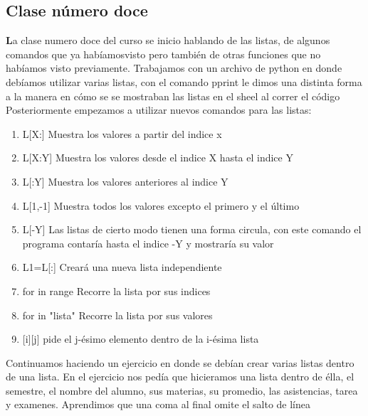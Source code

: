 \documentclass{book}
\begin{document}
\begin{enumerate}
\begin{enumerate}
\chapter{Clase número doce} 
\textbf La clase numero doce del curso se inicio hablando de las listas, de algunos comandos que ya habíamosvisto pero también de otras funciones que no habíamos visto previamente. Trabajamos con un archivo de python en donde debíamos utilizar varias listas, con el comando \color{blue} pprint \color{black} le dimos una distinta forma a la manera en cómo se se mostraban las listas en el sheel al correr el código\\
Posteriormente empezamos a utilizar nuevos comandos para las listas: 
\begin{enumerate}
	\item \color{green}L[X:] \color{orange} Muestra los valores a partir del indice x
	\item \color{green} L[X:Y] \color{orange} Muestra los valores desde el indice X hasta el indice Y \color{black}
	\item \color{green} L[:Y] \color{orange} Muestra los valores anteriores al indice Y \color{black} 
	\item \color{green} L[1,-1] \color{orange} Muestra todos los valores excepto el primero y el último \color{black}
	\item \color{green} L[-Y] \color{orange} Las listas de cierto modo tienen una forma circula, con este comando el programa contaría hasta el indice -Y y mostraría su valor \color{black}
	\item L1=L[:] \color{orange} Creará una nueva lista independiente \color{black}
	\item \color{green} for in range \color{orange} Recorre la lista por sus indices \color{black}
	\item \color{green} for in "lista" \color{orange} Recorre la lista por sus valores \color{black}
	\item \color{green} [i][j] \color{orange} pide el j-ésimo elemento dentro de la i-ésima lista 
\end{enumerate}
\color{black} Continuamos haciendo un ejercicio en donde se debían crear varias listas dentro de una lista. En el ejercicio nos pedía que hicieramos una lista dentro de élla, el semestre, el nombre del alumno, sus materias, su promedio, las asistencias, tarea y examenes. Aprendimos que una coma al final omite el salto de línea\\


\end{enumerate}
\end{enumerate}
\end{document}
